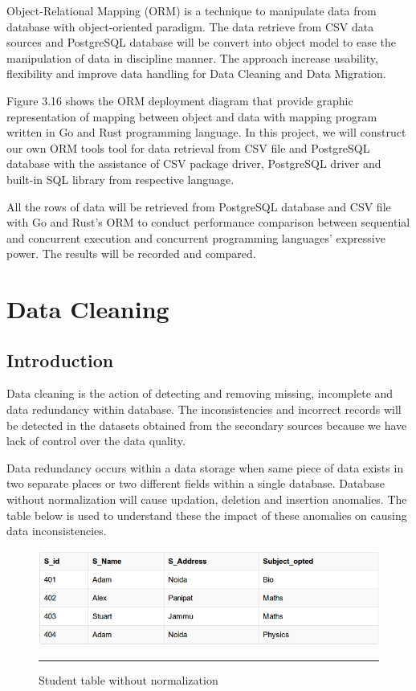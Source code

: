 Object-Relational Mapping (ORM) is a technique to manipulate data from database with object-oriented paradigm. The data retrieve from CSV data sources and PostgreSQL database will be convert into object model to ease the manipulation of data in discipline manner. \cite{orm-introduction} The approach increase usability, flexibility and improve data handling for Data Cleaning and Data Migration.

Figure 3.16 shows the ORM deployment diagram that provide graphic representation of mapping between object and data with mapping program written in Go and Rust programming language. In this project, we will construct our own ORM tools tool for data retrieval from CSV file and PostgreSQL database with the assistance of CSV package driver, PostgreSQL driver and built-in SQL library from respective language. 

All the rows of data will be retrieved from PostgreSQL database and CSV file with Go and Rust's ORM to conduct performance comparison between sequential and concurrent execution and concurrent programming languages' expressive power. The results will be recorded and compared. 

\section{Data Cleaning}

\subsection{Introduction}

Data cleaning is the action of detecting and removing missing, incomplete and data redundancy within database. \cite{data-cleaning-definition} The inconsistencies and incorrect records will be detected in the datasets obtained from the secondary sources because we have lack of control over the data quality. 

Data redundancy occurs within a data storage when same piece of data exists in two separate places or two different fields within a single database. Database without normalization will cause updation, deletion and insertion anomalies. The table below is used to understand these the impact of these anomalies on causing data inconsistencies. 

\begin{figure}[H]
	\centering
	\includegraphics[width=1.0\textwidth]{FYP2/Chapter3/denormalization-example.png}
	\rule{35em}{0.5pt}
	\caption[Student table without normalization]{Student table without normalization}
\end{figure}

